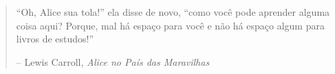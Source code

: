 
\newpage \vspace*{8cm}
\thispagestyle{empty}
\begin{quotation}
\begin{center}
  \large
  \enquote{Oh, Alice sua tola!} ela disse de novo, \enquote{como você pode aprender alguma coisa aqui? Porque, mal há espaço para você e não há espaço algum para livros de estudos!}
\end{center}
\begin{flushright} -- Lewis Carroll, \textit{Alice no País das Maravilhas}\end{flushright}
\end{quotation}
